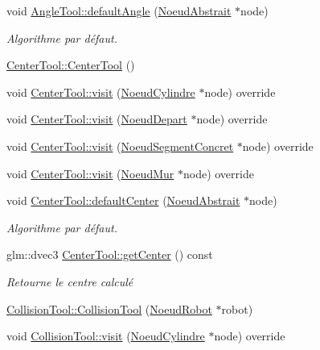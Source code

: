 \begin{DoxyCompactItemize}
\item 
void \hyperlink{group__inf2990_gac864ba35d8073ed9564a0a90d4df351d}{Angle\-Tool\-::default\-Angle} (\hyperlink{class_noeud_abstrait}{Noeud\-Abstrait} $\ast$node)
\begin{DoxyCompactList}\small\item\em Algorithme par défaut. \end{DoxyCompactList}\item 
\hyperlink{group__inf2990_ga3814d534b50e7dff7fbd7efef552685d}{Center\-Tool\-::\-Center\-Tool} ()
\item 
void \hyperlink{group__inf2990_ga9ceff880a444e12bc6b4dab4313c1809}{Center\-Tool\-::visit} (\hyperlink{class_noeud_cylindre}{Noeud\-Cylindre} $\ast$node) override
\item 
void \hyperlink{group__inf2990_ga8417547d629ccacfa218979e6ba6cdf5}{Center\-Tool\-::visit} (\hyperlink{class_noeud_depart}{Noeud\-Depart} $\ast$node) override
\item 
void \hyperlink{group__inf2990_gac441b1692c3b057050ced592ba372263}{Center\-Tool\-::visit} (\hyperlink{class_noeud_segment_concret}{Noeud\-Segment\-Concret} $\ast$node) override
\item 
void \hyperlink{group__inf2990_ga13d2bac067f4262be4fd60c302a07124}{Center\-Tool\-::visit} (\hyperlink{class_noeud_mur}{Noeud\-Mur} $\ast$node) override
\item 
void \hyperlink{group__inf2990_gab64cc9d2d491c0bd04a1efc4756740df}{Center\-Tool\-::default\-Center} (\hyperlink{class_noeud_abstrait}{Noeud\-Abstrait} $\ast$node)
\begin{DoxyCompactList}\small\item\em Algorithme par défaut. \end{DoxyCompactList}\item 
glm\-::dvec3 \hyperlink{group__inf2990_gaf086e5f530c5189f4b72563a4abfe35f}{Center\-Tool\-::get\-Center} () const 
\begin{DoxyCompactList}\small\item\em Retourne le centre calculé \end{DoxyCompactList}\item 
\hyperlink{group__inf2990_ga2f19aaeb96c50199582fbd6146a22505}{Collision\-Tool\-::\-Collision\-Tool} (\hyperlink{class_noeud_robot}{Noeud\-Robot} $\ast$robot)
\item 
void \hyperlink{group__inf2990_gaeabc2a2158a27714c8db5c076fe40720}{Collision\-Tool\-::visit} (\hyperlink{class_noeud_cylindre}{Noeud\-Cylindre} $\ast$node) override
\item 

\end{DoxyCompactItemize}

